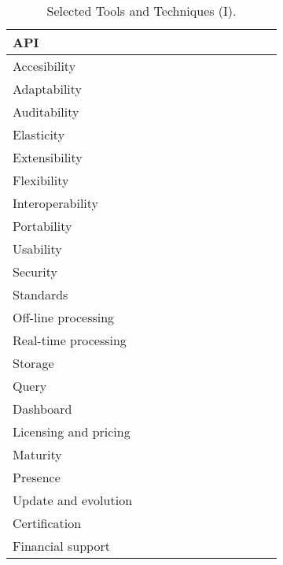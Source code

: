 \begin{sidewaystable}[!ht]
\begin{center}
\begin{tabular}[c]{|p{1.7cm}|p{1.5cm}|p{1.5cm}|p{1.5cm}|p{1.5cm}|p{1.5cm}|p{1.5cm}|p{1.5cm}|p{1.5cm}|p{1.5cm}|p{1.5cm}|p{1.5cm}|}
  API &  &   &  &  & & &  &  &  &  & \\ \hline  
  Accesibility &  &  & &  &  &  &  &  &  &  & \\ \hline  
  Adaptability &  & &  &  &  &  &  &  &  &  & \\ \hline  
  Auditability &  & &  &  &  &  &  &  &  &  & \\ \hline  
  Elasticity &  & &  &  &  &  &  &  &  &  & \\ \hline  
  Extensibility &  & &  &  &  &  &  &  &  &  & \\ \hline  
  Flexibility &  & &  &  &  &  &  &  &  &  & \\ \hline  
  Interoperability &  & &  &  &  &  &  &  &  &  & \\ \hline  
  Portability &  & &  &  &  &  &  &  &  &  & \\ \hline  
  Usability &  & &  &  &  &  &  &  &  &  & \\ \hline  
  Security &  & &  &  &  &  &  &  &  &  & \\ \hline  
  Standards &  &  & &  &  &  &  &  &  &  & \\ \hline  
  Off-line processing &  &  & &  &  &  &  &  &  &  & \\ \hline  
  Real-time processing &  & &  &  &  &  &  &  &  &  & \\ \hline  
  Storage &  & &  &  &  &  &  &  &  &  & \\ \hline  
  Query &  & &  &  &  &  &  &  &  &  & \\ \hline  
  Dashboard &  &  & &  &  &  &  &  &  &  & \\ \hline  
  Licensing and pricing &  & &  &  &  &  &  &  &  &  & \\ \hline  
  Maturity &  & &  &  &  &  &  &  &  &  & \\ \hline  
  Presence &  &  & &  &  &  &  &  &  &  & \\ \hline  
  Update and evolution &  &  & &  &  &  &  &  &  &  & \\ \hline  
  Certification &  & &  &  &  &  &  &  &  &  & \\ \hline  
  Financial support &  & & &  &  &  &  &  &  &  & \\ \hline  
  
\hline
\end{tabular}
\caption{Selected Tools and Techniques (I).}\label{table:tools-1}
  \end{center}
\end{sidewaystable} 

